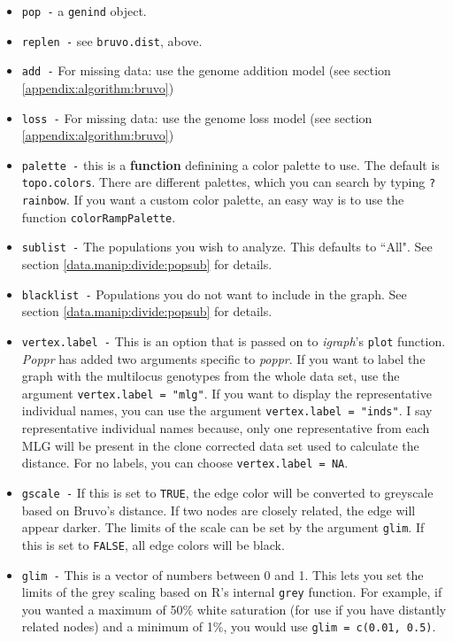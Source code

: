 \documentclass[letterpaper]{article}\usepackage[]{graphicx}\usepackage[]{color}
\begin{document}
\begin{itemize}
  \item \texttt{pop -} a \texttt{genind} object.
  \item \texttt{replen -} see \texttt{bruvo.dist}, above.
  \item \texttt{add -} For missing data: use the genome addition model (see section \ref{appendix:algorithm:bruvo})
  \item \texttt{loss -} For missing data: use the genome loss model (see section \ref{appendix:algorithm:bruvo})
  \item \texttt{palette -} this is a \textbf{function} definining a color palette to use. The default is \texttt{topo.colors}. There are different palettes, which you can search by typing \texttt{?rainbow}. If you want a custom color palette, an easy way is to use the function \texttt{colorRampPalette}.
  \item \texttt{sublist -} The populations you wish to analyze. This defaults to ``All". See section \ref{data.manip:divide:popsub} for details.
  \item \texttt{blacklist -} Populations you do not want to include in the graph. See section \ref{data.manip:divide:popsub} for details.
  \item \texttt{vertex.label -} This is an option that is passed on to \textit{igraph}'s \texttt{plot} function. \textit{Poppr} has added two arguments specific to \textit{poppr}. If you want to label the graph with the multilocus genotypes from the whole data set, use the argument \texttt{vertex.label = "mlg"}. If you want to display the representative individual names, you can use the argument \texttt{vertex.label = "inds"}. I say representative individual names because, only one representative from each MLG will be present in the clone corrected data set used to calculate the distance. For no labels, you can choose \texttt{vertex.label = NA}. 
  \item \texttt{gscale -} If this is set to \texttt{TRUE}, the edge color will be converted to greyscale based on Bruvo's distance. If two nodes are closely related, the edge will appear darker. The limits of the scale can be set by the argument \texttt{glim}. If this is set to \texttt{FALSE}, all edge colors will be black. 
  \item \texttt{glim -} This is a vector of numbers between 0 and 1. This lets you set the limits of the grey scaling based on R's internal \texttt{grey} function. For example, if you wanted a maximum of 50\% white saturation (for use if you have distantly related nodes) and a minimum of 1\%, you would use \texttt{glim = c(0.01, 0.5)}. 

\end{itemize}
\end{document}
